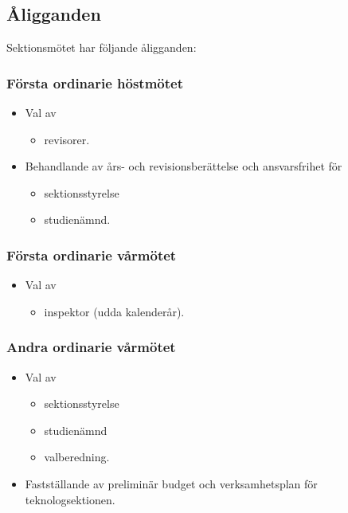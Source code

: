 \subsection{Åligganden}
Sektionsmötet har följande åligganden:
\subsubsection{Första ordinarie höstmötet}
\begin{itemize}
	\item Val av 
	\begin{itemize}

		\item revisorer.
	\end{itemize}
	\item Behandlande av års- och revisionsberättelse och ansvarsfrihet för 
	\begin{itemize}
		\item sektionsstyrelse
		\item studienämnd.
	\end{itemize}
\end{itemize}
	
\subsubsection{Första ordinarie vårmötet}
\begin{itemize}
	\item Val av 
	\begin{itemize}
		\item inspektor (udda kalenderår).
	\end{itemize}
\end{itemize}


\subsubsection{Andra ordinarie vårmötet}
\begin{itemize}
	\item Val av 
	\begin{itemize}
		\item sektionsstyrelse
		\item studienämnd 		
		\item valberedning.
	\end{itemize}
	\item Fastställande av preliminär budget och verksamhetsplan för teknologsektionen.
\end{itemize}

